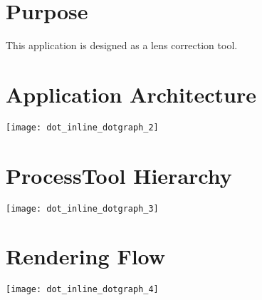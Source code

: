 \hypertarget{index_Purpose}{}\section{Purpose}\label{index_Purpose}
This application is designed as a lens correction tool.\hypertarget{index_arch}{}\section{Application Architecture}\label{index_arch}

\begin{DoxyImageNoCaption}
  \mbox{\texttt{[image: dot\_inline\_dotgraph\_2]}}
\end{DoxyImageNoCaption}
\hypertarget{index_process}{}\section{Process\+Tool Hierarchy}\label{index_process}

\begin{DoxyImageNoCaption}
  \mbox{\texttt{[image: dot\_inline\_dotgraph\_3]}}
\end{DoxyImageNoCaption}
\hypertarget{index_rendering}{}\section{Rendering Flow}\label{index_rendering}

\begin{DoxyImageNoCaption}
  \mbox{\texttt{[image: dot\_inline\_dotgraph\_4]}}
\end{DoxyImageNoCaption}
 
